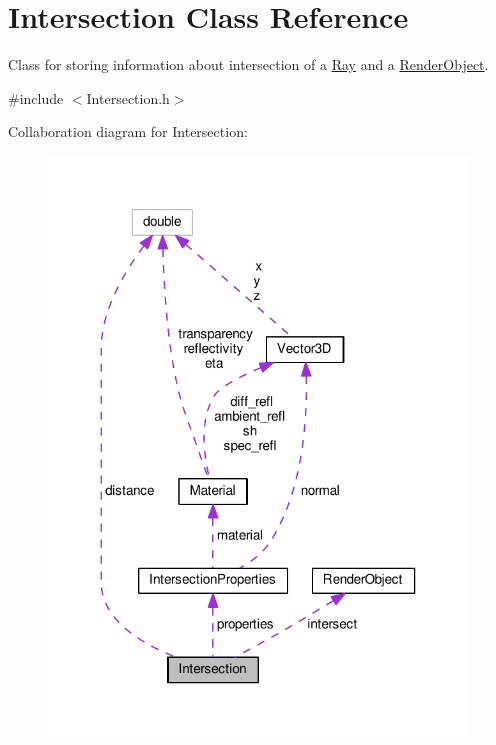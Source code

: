 \hypertarget{classIntersection}{}\section{Intersection Class Reference}
\label{classIntersection}


Class for storing information about intersection of a \hyperlink{classRay}{Ray} and a \hyperlink{classRenderObject}{Render\+Object}.  




{\ttfamily \#include $<$Intersection.\+h$>$}



Collaboration diagram for Intersection\+:
\nopagebreak
\begin{figure}[H]
\begin{center}
\leavevmode
\includegraphics[width=316pt]{classIntersection__coll__graph}
\end{center}
\end{figure}
